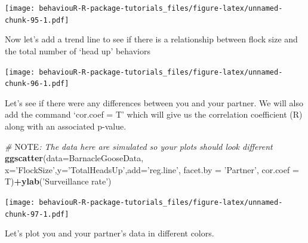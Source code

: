 \documentclass[]{book}
\newenvironment{Shaded}{\begin{snugshade}}{\end{snugshade}}
\newcommand{\AlertTok}[1]{\textcolor[rgb]{0.94,0.16,0.16}{#1}}
\newcommand{\CommentTok}[1]{\textcolor[rgb]{0.56,0.35,0.01}{\textit{#1}}}
\newcommand{\DataTypeTok}[1]{\textcolor[rgb]{0.13,0.29,0.53}{#1}}
\newcommand{\DecValTok}[1]{\textcolor[rgb]{0.00,0.00,0.81}{#1}}
\newcommand{\KeywordTok}[1]{\textcolor[rgb]{0.13,0.29,0.53}{\textbf{#1}}}
\newcommand{\NormalTok}[1]{#1}
\newcommand{\OperatorTok}[1]{\textcolor[rgb]{0.81,0.36,0.00}{\textbf{#1}}}
\newcommand{\StringTok}[1]{\textcolor[rgb]{0.31,0.60,0.02}{#1}}
\begin{document}
\texttt{[image: behaviouR-R-package-tutorials\_files/figure-latex/unnamed-chunk-95-1.pdf]}

Now let's add a trend line to see if there is a relationship between flock size and the total number of `head up' behaviors

\begin{Shaded}
\end{Shaded}

\texttt{[image: behaviouR-R-package-tutorials\_files/figure-latex/unnamed-chunk-96-1.pdf]}

Let's see if there were any differences between you and your partner. We will also add the command `cor.coef = T' which will give us the correlation coefficient (R) along with an associated p-value.

\begin{Shaded}
\begin{Highlighting}[]
\CommentTok{# }\AlertTok{NOTE}\CommentTok{: The data here are simulated so your plots should look different}
\KeywordTok{ggscatter}\NormalTok{(}\DataTypeTok{data=}\NormalTok{BarnacleGooseData,}
          \DataTypeTok{x=}\StringTok{'FlockSize'}\NormalTok{,}\DataTypeTok{y=}\StringTok{'TotalHeadsUp'}\NormalTok{,}\DataTypeTok{add=}\StringTok{'reg.line'}\NormalTok{, }\DataTypeTok{facet.by =} \StringTok{'Partner'}\NormalTok{,}
          \DataTypeTok{cor.coef =}\NormalTok{ T)}\OperatorTok{+}\KeywordTok{ylab}\NormalTok{(}\StringTok{'Surveillance rate'}\NormalTok{)}
\end{Highlighting}
\end{Shaded}

\texttt{[image: behaviouR-R-package-tutorials\_files/figure-latex/unnamed-chunk-97-1.pdf]}

Let's plot you and your partner's data in different colors.
\end{document}

